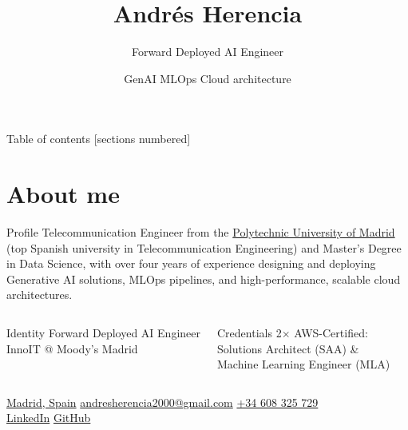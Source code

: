 \documentclass[10pt]{beamer}
\title{Andr\'es Herencia}
\subtitle{Forward Deployed AI Engineer}
\author[Andr\'es Herencia]{GenAI \textbullet{} MLOps \textbullet{} Cloud architecture}
\institute{InnoIT @ Moody's, Madrid}
\date{}
\begin{document}
{
  \maketitle
}

\begin{frame}{Table of contents}
  [sections numbered]
  \tableofcontents[hideallsubsections]
\end{frame}

\section{About me}

\begin{frame}{Profile}
  Telecommunication Engineer from the
  \href{https://www.upm.es/}{Polytechnic University of Madrid}
  (top Spanish university in Telecommunication Engineering) and
  Master's Degree in Data Science, with \alert{over four years} of experience
  designing and deploying Generative AI solutions, MLOps pipelines, and
  high-performance, scalable cloud architectures.

  \vspace{0.6em}
  \begin{columns}[T,onlytextwidth]
      \begin{block}{Identity}
        Forward Deployed AI Engineer\\
        InnoIT @ Moody's \textbullet{} Madrid
      \end{block}
      \begin{exampleblock}{Credentials}
        2$\times$ AWS-Certified:\\
        Solutions Architect (SAA) \&\\
        Machine Learning Engineer (MLA)
      \end{exampleblock}
  \end{columns}

  \vspace{0.35em}
  {\footnotesize
    \href{https://maps.app.goo.gl/QnwKxmFKUzQpsAaU6}{Madrid, Spain}
    \textbullet{}
    \href{mailto:andresherencia2000@gmail.com}{andresherencia2000@gmail.com}
    \textbullet{}
    \href{tel:+34608325729}{+34 608 325 729}\\
    \href{https://www.linkedin.com/in/andres-herencia/}{LinkedIn}
    \textbullet{}
    \href{https://github.com/andreshere00}{GitHub}
  }
\end{frame}
\end{document}
